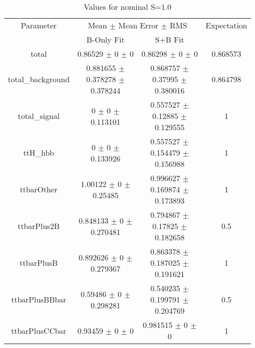 \begin{table}
\centering
\caption{Values for nominal S=1.0}
\begin{tabular}{cccc}
\toprule
Parameter & \multicolumn{2}{c}{Mean $\pm$ Mean Error $\pm$ RMS} & Expectation\\
 & B-Only Fit & S+B Fit & \\
\midrule
total & \num{0.86529} $\pm$ \num{0} $\pm$ \num{0} & \num{0.86298} $\pm$ \num{0} $\pm$ \num{0} & \num{0.868573}\\
total\_background & \num{0.881655} $\pm$ \num{0.378278} $\pm$ \num{0.378244} & \num{0.868757} $\pm$ \num{0.37995} $\pm$ \num{0.380016} & \num{0.864798}\\
total\_signal & \num{0} $\pm$ \num{0} $\pm$ \num{0.113101} & \num{0.557527} $\pm$ \num{0.12885} $\pm$ \num{0.129555} & \num{1}\\
ttH\_hbb & \num{0} $\pm$ \num{0} $\pm$ \num{0.133926} & \num{0.557527} $\pm$ \num{0.154479} $\pm$ \num{0.156988} & \num{1}\\
ttbarOther & \num{1.00122} $\pm$ \num{0} $\pm$ \num{0.25485} & \num{0.996627} $\pm$ \num{0.169874} $\pm$ \num{0.173893} & \num{1}\\
ttbarPlus2B & \num{0.848133} $\pm$ \num{0} $\pm$ \num{0.270481} & \num{0.794867} $\pm$ \num{0.17825} $\pm$ \num{0.182658} & \num{0.5}\\
ttbarPlusB & \num{0.892626} $\pm$ \num{0} $\pm$ \num{0.279367} & \num{0.863378} $\pm$ \num{0.187025} $\pm$ \num{0.191621} & \num{1}\\
ttbarPlusBBbar & \num{0.59486} $\pm$ \num{0} $\pm$ \num{0.298281} & \num{0.540235} $\pm$ \num{0.199791} $\pm$ \num{0.204769} & \num{0.5}\\
ttbarPlusCCbar & \num{0.93459} $\pm$ \num{0} $\pm$ \num{0} & \num{0.981515} $\pm$ \num{0} $\pm$ \num{0} & \num{1}\\
\bottomrule
\end{tabular}
\end{table}